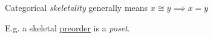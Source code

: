 Categorical \emph{skeletality} generally means $x \cong y \implies x = y$

E.g. a skeletal \href{doc/1 math/Seven Sketches in Compositionality/1 Generative Effects/3 Preorders/Preorder}{preorder} is a \emph{poset}.